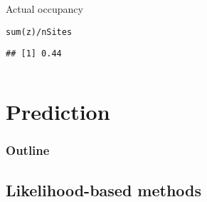 \documentclass[color=usenames,dvipsnames]{beamer}\usepackage[]{graphicx}\usepackage[]{xcolor}
\makeatletter
\newcommand{\hlopt}[1]{\textcolor[rgb]{0,0,0}{#1}}%
\newcommand{\hldef}[1]{\textcolor[rgb]{0,0,0}{#1}}%
\newcommand{\hlkwd}[1]{\textcolor[rgb]{0.004,0.004,0.506}{#1}}%
\newenvironment{kframe}{%
 \def\at@end@of@kframe{}%
 \ifinner\ifhmode%
  \def\at@end@of@kframe{\end{minipage}}%
  \begin{minipage}{\columnwidth}%
 \fi\fi%
 \def\FrameCommand##1{\hskip\@totalleftmargin \hskip-\fboxsep
 \colorbox{shadecolor}{##1}\hskip-\fboxsep
     \hskip-\linewidth \hskip-\@totalleftmargin \hskip\columnwidth}%
 \MakeFramed {\advance\hsize-\width
   \@totalleftmargin\z@ \linewidth\hsize
   \@setminipage}}%
 {\par\unskip\endMakeFramed%
 \at@end@of@kframe}
\newenvironment{knitrout}{}{} %
\makeatother
\begin{document}
\begin{frame}[fragile]
\begin{columns}
\begin{column}{0.6\textwidth}
    \vspace{12pt}
    {\centering Actual occupancy \\}
\begin{knitrout}\scriptsize
{}\color{fgcolor}\begin{kframe}
\begin{alltt}
\hlkwd{sum}\hldef{(z)} \hlopt{/} \hldef{nSites}
\end{alltt}
\begin{verbatim}
## [1] 0.44
\end{verbatim}
\end{kframe}
\end{knitrout}
  \end{column}
  \end{columns}
\end{frame}



\section{Prediction}



\begin{frame}
  \frametitle{Outline}
  \Large
  \tableofcontents[currentsection]
\end{frame}



\subsection{Likelihood-based methods}
\end{document}
